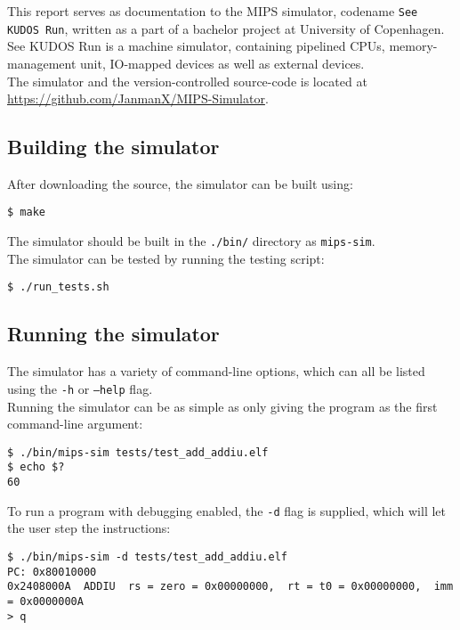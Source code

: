 This report serves as documentation to the MIPS simulator, codename
\texttt{See KUDOS Run}, written as a part of a bachelor project at University
of Copenhagen. See KUDOS Run is a machine simulator, containing pipelined CPUs,
memory-management unit, IO-mapped devices as well as external devices.\\
The simulator and the version-controlled source-code is located at \url{https://github.com/JanmanX/MIPS-Simulator}.
\subsection*{Building the simulator}
After downloading the source, the simulator can be built using:
\begin{verbatim}
$ make
\end{verbatim}
The simulator should be built in the \texttt{./bin/} directory as \texttt{mips-sim}.\\
The simulator can be tested by running the testing script:\\
\begin{verbatim}
$ ./run_tests.sh
\end{verbatim}
\subsection*{Running the simulator}
The simulator has a variety of command-line options, which can all be listed
using the \texttt{-h} or \texttt{--help} flag.\\
Running the simulator can be as simple as only giving the program as the first
command-line argument:
\begin{verbatim}
$ ./bin/mips-sim tests/test_add_addiu.elf
$ echo $?
60
\end{verbatim}
To run a program with debugging enabled, the \texttt{-d} flag is supplied, which
will let the user step the instructions:
\begin{verbatim}
$ ./bin/mips-sim -d tests/test_add_addiu.elf
PC: 0x80010000
0x2408000A	ADDIU  rs = zero = 0x00000000,  rt = t0 = 0x00000000,  imm = 0x0000000A
> q
\end{verbatim}

